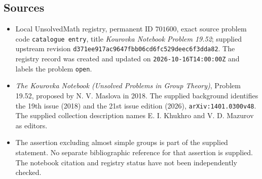 \documentclass[11pt]{article}
\begin{document}
\subsection{Sources}
\begin{itemize}
\item Local UnsolvedMath registry, permanent ID \(701600\), exact source problem code \texttt{catalogue entry}, title \emph{Kourovka Notebook Problem 19.52}; supplied upstream revision \texttt{d371ee917ac9647fbb06cd6fc529deec6f3dda82}. The registry record was created and updated on \texttt{2026-10-16T14:00:00Z} and labels the problem \texttt{open}.
\item \emph{The Kourovka Notebook (Unsolved Problems in Group Theory)}, Problem 19.52, proposed by N. V. Maslova in 2018. The supplied background identifies the 19th issue (2018) and the 21st issue edition (2026), \texttt{arXiv:1401.0300v48}. The supplied collection description names E. I. Khukhro and V. D. Mazurov as editors.
\item The assertion excluding almost simple groups is part of the supplied statement. No separate bibliographic reference for that assertion is supplied. The notebook citation and registry status have not been independently checked.
\end{itemize}
\end{document}
